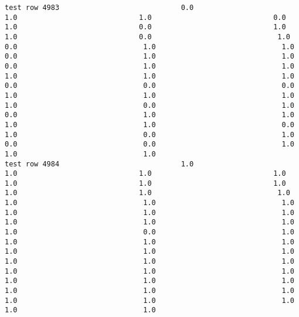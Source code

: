 \documentclass[11pt]{article}
\begin{document}
\begin{verbatim}
test row 4983                             0.0                             1.0                             1.0                             0.0                             1.0                             0.0                             1.0                             1.0                             0.0                              1.0                              0.0                              1.0                              1.0                              0.0                              1.0                              1.0                              0.0                              1.0                              1.0                              1.0                              1.0                              1.0                              0.0                              0.0                              0.0                              1.0                              1.0                              1.0                              1.0                              0.0                              1.0                              0.0                              1.0                              1.0                              1.0                              1.0                              0.0                              1.0                              0.0                              1.0                              0.0                              0.0                              1.0                              1.0                              1.0
test row 4984                             1.0                             1.0                             1.0                             1.0                             1.0                             1.0                             1.0                             1.0                             1.0                              1.0                              1.0                              1.0                              1.0                              1.0                              1.0                              1.0                              1.0                              1.0                              1.0                              1.0                              0.0                              1.0                              1.0                              1.0                              1.0                              1.0                              1.0                              1.0                              1.0                              1.0                              1.0                              1.0                              1.0                              1.0                              1.0                              1.0                              1.0                              1.0                              1.0                              1.0                              1.0                              1.0                              1.0                              1.0                              1.0

\end{verbatim}
\end{document}
